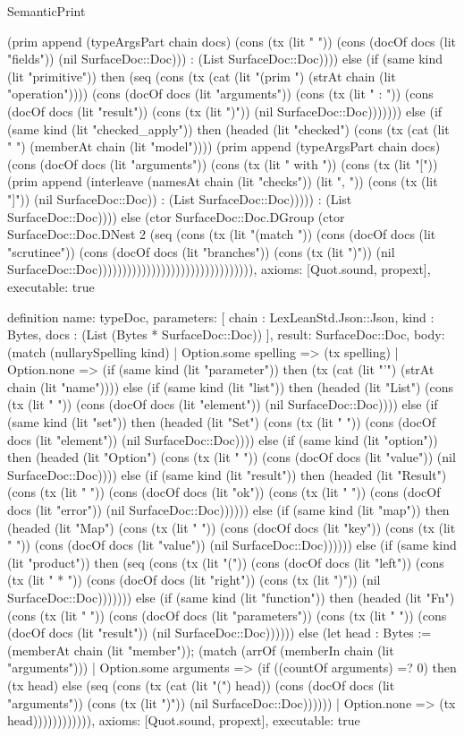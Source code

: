 \begin{lexlean}{SemanticPrint}
\begin{semanticmodule}
{(prim append (typeArgsPart chain docs) (cons (tx (lit " ")) (cons (docOf docs (lit "fields")) (nil SurfaceDoc::Doc))) : (List SurfaceDoc::Doc)))) else (if (same kind (lit "primitive")) then (seq (cons (tx (cat (lit "(prim ") (strAt chain (lit "operation")))) (cons (docOf docs (lit "arguments")) (cons (tx (lit " : ")) (cons (docOf docs (lit "result")) (cons (tx (lit ")")) (nil SurfaceDoc::Doc))))))) else (if (same kind (lit "checked_apply")) then (headed (lit "checked") (cons (tx (cat (lit " ") (memberAt chain (lit "model")))) (prim append (typeArgsPart chain docs) (cons (docOf docs (lit "arguments")) (cons (tx (lit " with ")) (cons (tx (lit "[")) (prim append (interleave (namesAt chain (lit "checks")) (lit ", ")) (cons (tx (lit "]")) (nil SurfaceDoc::Doc)) : (List SurfaceDoc::Doc))))) : (List SurfaceDoc::Doc)))) else (ctor SurfaceDoc::Doc.DGroup (ctor SurfaceDoc::Doc.DNest 2 (seq (cons (tx (lit "(match ")) (cons (docOf docs (lit "scrutinee")) (cons (docOf docs (lit "branches")) (cons (tx (lit ")")) (nil SurfaceDoc::Doc)))))))))))))))))))))))))))))))),
  axioms: [Quot.sound, propext],
  executable: true
}

definition{
  name: typeDoc,
  parameters: [
    chain : LexLeanStd.Json::Json,
    kind : Bytes,
    docs : (List (Bytes * SurfaceDoc::Doc))
  ],
  result: SurfaceDoc::Doc,
  body: (match (nullarySpelling kind)
    | Option.some spelling => (tx spelling)
    | Option.none => (if (same kind (lit "parameter")) then (tx (cat (lit "'") (strAt chain (lit "name")))) else (if (same kind (lit "list")) then (headed (lit "List") (cons (tx (lit " ")) (cons (docOf docs (lit "element")) (nil SurfaceDoc::Doc)))) else (if (same kind (lit "set")) then (headed (lit "Set") (cons (tx (lit " ")) (cons (docOf docs (lit "element")) (nil SurfaceDoc::Doc)))) else (if (same kind (lit "option")) then (headed (lit "Option") (cons (tx (lit " ")) (cons (docOf docs (lit "value")) (nil SurfaceDoc::Doc)))) else (if (same kind (lit "result")) then (headed (lit "Result") (cons (tx (lit " ")) (cons (docOf docs (lit "ok")) (cons (tx (lit " ")) (cons (docOf docs (lit "error")) (nil SurfaceDoc::Doc)))))) else (if (same kind (lit "map")) then (headed (lit "Map") (cons (tx (lit " ")) (cons (docOf docs (lit "key")) (cons (tx (lit " ")) (cons (docOf docs (lit "value")) (nil SurfaceDoc::Doc)))))) else (if (same kind (lit "product")) then (seq (cons (tx (lit "(")) (cons (docOf docs (lit "left")) (cons (tx (lit " * ")) (cons (docOf docs (lit "right")) (cons (tx (lit ")")) (nil SurfaceDoc::Doc))))))) else (if (same kind (lit "function")) then (headed (lit "Fn") (cons (tx (lit " ")) (cons (docOf docs (lit "parameters")) (cons (tx (lit " ")) (cons (docOf docs (lit "result")) (nil SurfaceDoc::Doc)))))) else (let head : Bytes := (memberAt chain (lit "member")); (match (arrOf (memberIn chain (lit "arguments")))
      | Option.some arguments => (if ((countOf arguments) =? 0) then (tx head) else (seq (cons (tx (cat (lit "(") head)) (cons (docOf docs (lit "arguments")) (cons (tx (lit ")")) (nil SurfaceDoc::Doc))))))
      | Option.none => (tx head)))))))))))),
  axioms: [Quot.sound, propext],
  executable: true
}


\end{semanticmodule}
\end{lexlean}
